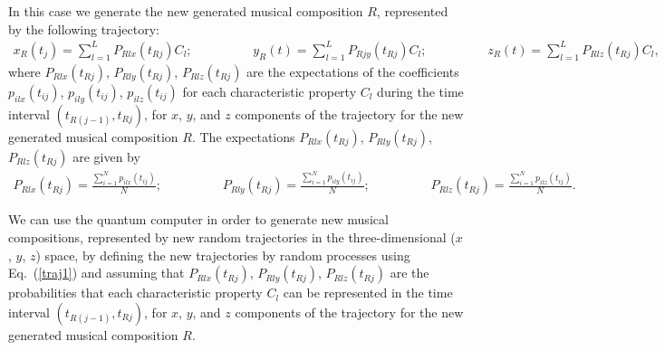 \documentclass[preprintnumbers,amsmath,amssymb]{revtex4}
\begin{document}
In this case we generate the new generated musical composition $R$, represented by the following trajectory:
\begin{eqnarray}
\label{traj1} x_{R}(t_{j}) = \sum_{l = 1}^{L} P_{Rlx}(t_{Rj}) C_{l}; \hspace{2cm} y_{R}(t) = \sum_{l = 1}^{L} P_{Rjy}(t_{Rj}) C_{l};
 \hspace{2cm} z_{R}(t) = \sum_{l = 1}^{L} P_{Rlz}(t_{Rj}) C_{l} ,
\end{eqnarray}
where   $P_{Rlx}(t_{Rj})$, $P_{Rly}(t_{Rj})$, $P_{Rlz}(t_{Rj})$  are the expectations of the coefficients
$p_{ilx}(t_{ij})$, $p_{ily}(t_{ij})$, $p_{ilz}(t_{ij})$ for each characteristic property $C_{l}$ during the time interval $(t_{R(j-1)}, t_{Rj})$,
for $x$, $y$, and $z$ components of the trajectory for the new generated musical composition $R$.
The expectations $P_{Rlx}(t_{Rj})$, $P_{Rly}(t_{Rj})$, $P_{Rlz}(t_{Rj})$ are given by
\begin{eqnarray}
\label{prob} P_{Rlx}(t_{Rj}) = \frac{\sum_{i = 1}^{N}  p_{ilx}(t_{ij})}{N}; \hspace{2cm}
P_{Rly}(t_{Rj}) = \frac{\sum_{i = 1}^{N}  p_{ily}(t_{ij})}{N}; \hspace{2cm}
P_{Rlz}(t_{Rj}) = \frac{\sum_{i = 1}^{N}  p_{ilz}(t_{ij})}{N} .
\end{eqnarray}

We can use the quantum computer in order to generate new musical compositions, represented by new random trajectories in the three-dimensional ($x$, $y$, $z$) space,
by defining the new trajectories by random processes using Eq.~(\ref{traj1}) and assuming that $P_{Rlx}(t_{Rj})$, $P_{Rly}(t_{Rj})$, $P_{Rlz}(t_{Rj})$  are the probabilities that each characteristic property $C_{l}$ can be represented
in the time interval $(t_{R(j-1)}, t_{Rj})$, for $x$, $y$, and $z$ components of the trajectory for the new generated musical composition $R$.
\end{document}
